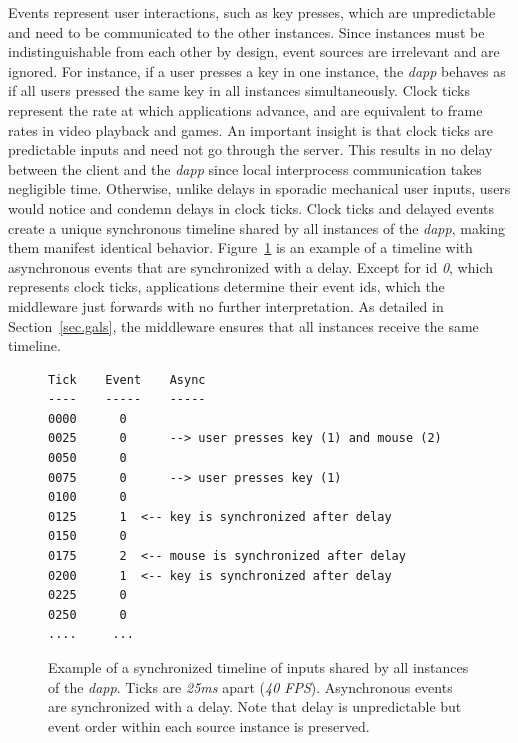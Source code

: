 \documentclass[sigplan,screen]{acmart}
\newcommand{\dapp}{\emph{dapp}\xspace}
\begin{document}
Events represent user interactions, such as key presses, which are
unpredictable and need to be communicated to the other instances.
Since instances must be indistinguishable from each other by design, event
sources are irrelevant and are ignored.
For instance, if a user presses a key in one instance, the \dapp behaves as if
all users pressed the same key in all instances simultaneously.
%
Clock ticks represent the rate at which applications advance, and are
equivalent to frame rates in video playback and games.
An important insight is that clock ticks are predictable inputs and need not go
through the server.
This results in no delay between the client and the \dapp since local
interprocess communication takes negligible time.
Otherwise, unlike delays in sporadic mechanical user inputs, users would notice
and condemn delays in clock ticks.
%
Clock ticks and delayed events create a unique synchronous timeline shared by
all instances of the \dapp, making them manifest identical behavior.
Figure~\ref{fig.timeline} is an example of a timeline with asynchronous events
that are synchronized with a delay.
Except for id \emph{0}, which represents clock ticks, applications determine
their event ids, which the middleware just forwards with no further
interpretation.
As detailed in Section~\ref{sec.gals}, the middleware ensures that all
instances receive the same timeline.

\begin{figure}[t]
{\scriptsize
\begin{verbatim}
Tick    Event    Async
----    -----    -----
0000      0
0025      0      --> user presses key (1) and mouse (2)
0050      0
0075      0      --> user presses key (1)
0100      0
0125      1  <-- key is synchronized after delay
0150      0
0175      2  <-- mouse is synchronized after delay
0200      1  <-- key is synchronized after delay
0225      0
0250      0
....     ...
\end{verbatim}
}
  \caption{
    \label{fig.timeline}
    Example of a synchronized timeline of inputs shared by all instances of the
    \dapp.
    Ticks are \emph{25ms} apart (\emph{40 FPS}).
    Asynchronous events are synchronized with a delay.
    Note that delay is unpredictable but event order within each source
    instance is preserved.
  }
\end{figure}
\end{document}
